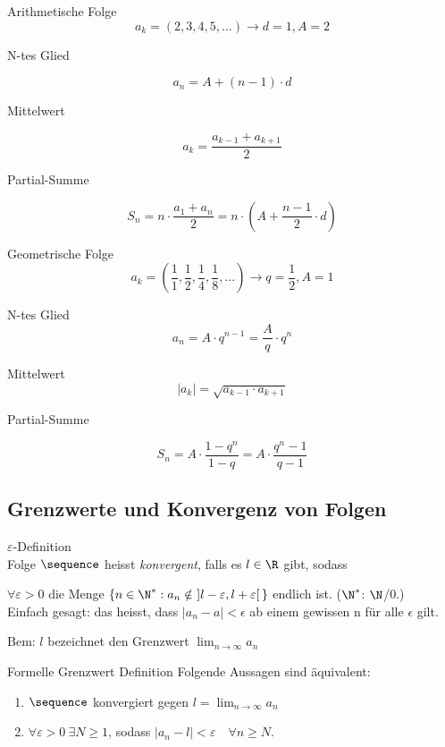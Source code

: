 \begin{definition}{Arithmetische Folge}
$$
a_{k}=(2,3,4,5, \ldots) \rightarrow d=1, A=2
$$

N-tes Glied

$$
a_{n}=A+(n-1) \cdot d
$$

Mittelwert

$$
a_{k}=\frac{a_{k-1}+a_{k+1}}{2}
$$

Partial-Summe

$$
S_{n}=n \cdot \frac{a_{1}+a_{n}}{2}=n \cdot\left(A+\frac{n-1}{2} \cdot d\right)
$$
\end{definition}

\begin{definition}{Geometrische Folge}
$$
a_{k}=\left(\frac{1}{1}, \frac{1}{2}, \frac{1}{4}, \frac{1}{8}, \ldots\right) \rightarrow q=\frac{1}{2}, A=1
$$

N-tes Glied
$$a_{n}=A \cdot q^{n-1}=\frac{A}{q} \cdot q^{n}$$

Mittelwert
$$
\left|a_{k}\right|=\sqrt{a_{k-1} \cdot a_{k+1}}
$$

Partial-Summe

$$
S_{n}=A \cdot \frac{1-q^{n}}{1-q}=A \cdot \frac{q^{n}-1}{q-1}
$$
\end{definition}

\subsection{Grenzwerte und Konvergenz von Folgen}

\begin{definition}{$\varepsilon$-Definition}
    \\Folge $\sequence$ heisst \emph{konvergent}, falls es $l \in \R$ gibt, sodass \vspace{1mm}

    $\forall \varepsilon > 0$ die Menge $\{n \in \N^* : a_n \notin~] l - \varepsilon, l + \varepsilon[\,\}$ endlich ist. ($\N^*$: $\N$/$0$.) \vspace{1mm} \\
    Einfach gesagt: das heisst, dass $|a_n - a| < \epsilon$ ab einem gewissen n für alle $\epsilon$ gilt.

\end{definition}

Bem: $l$ bezeichnet den Grenzwert $\lim_{n \to \infty} a_n$

\begin{definition}{Formelle Grenzwert Definition}
    Folgende Aussagen sind äquivalent:
    \begin{enumerate}
        \item $\sequence$ konvergiert gegen $l = \lim_{n \to \infty} a_n$
        \item $\forall \varepsilon > 0~\exists N \geq 1$, sodass $|a_n -l | < \varepsilon \quad \forall n \geq N$.
    \end{enumerate}
\end{definition}

